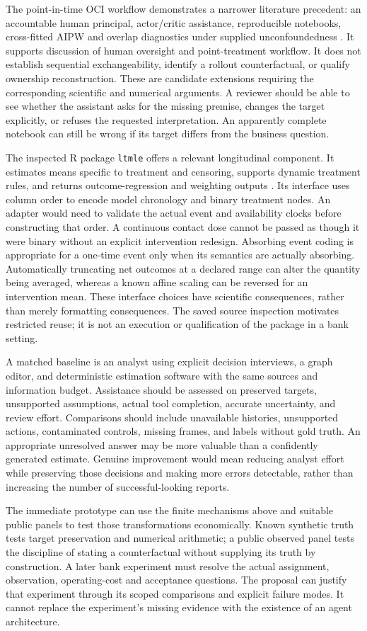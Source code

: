 The point-in-time OCI workflow demonstrates a narrower literature precedent:
an accountable human principal, actor/critic assistance, reproducible notebooks,
cross-fitted AIPW and overlap diagnostics under supplied unconfoundedness
\citep{exec13_data_oci}. It supports discussion of human oversight and
point-treatment workflow. It does not establish sequential exchangeability,
identify a rollout counterfactual, or qualify ownership reconstruction. These
are candidate extensions requiring the corresponding scientific and numerical
arguments. A reviewer should be able to see whether the assistant asks for
the missing premise, changes the target explicitly, or refuses the requested
interpretation. An apparently complete notebook can still be wrong if its
target differs from the business question.

The inspected R package \texttt{ltmle} offers a relevant longitudinal
component. It estimates means specific to treatment and censoring, supports
dynamic treatment rules, and returns outcome-regression and weighting
outputs \citep{sw_ltmle}. Its interface
uses column order to encode model chronology and binary treatment nodes.
An adapter would need to validate the actual event and availability clocks
before constructing that order. A continuous contact dose cannot be passed
as though it were binary without an explicit intervention redesign.
Absorbing event coding is appropriate for a one-time event only when its
semantics are actually absorbing. Automatically truncating net outcomes at a
declared range can alter the quantity being averaged, whereas a known affine
scaling can be reversed for an intervention mean. These interface choices
have scientific consequences, rather than merely formatting consequences.
The saved source inspection motivates restricted reuse; it is not an execution
or qualification of the package in a bank setting.

A matched baseline is an analyst using explicit decision interviews, a graph
editor, and deterministic estimation software with the same sources and
information budget. Assistance should be assessed on preserved targets,
unsupported assumptions, actual tool completion, accurate uncertainty, and
review effort. Comparisons should include unavailable histories, unsupported
actions, contaminated controls, missing frames, and labels without gold truth.
An appropriate unresolved answer may be more valuable than a confidently
generated estimate. Genuine improvement would mean reducing analyst effort
while preserving those decisions and making more errors detectable, rather
than increasing the number of successful-looking reports.

The immediate prototype can use the finite mechanisms above and suitable
public panels to test those transformations economically. Known synthetic
truth tests target preservation and numerical arithmetic; a public observed
panel tests the discipline of stating a counterfactual without supplying its
truth by construction. A later bank experiment must resolve the actual
assignment, observation, operating-cost and acceptance questions. The proposal
can justify that experiment through its scoped comparisons and explicit
failure modes. It cannot replace the experiment's missing evidence with the
existence of an agent architecture.
\label{exec14:l5-development-end}
